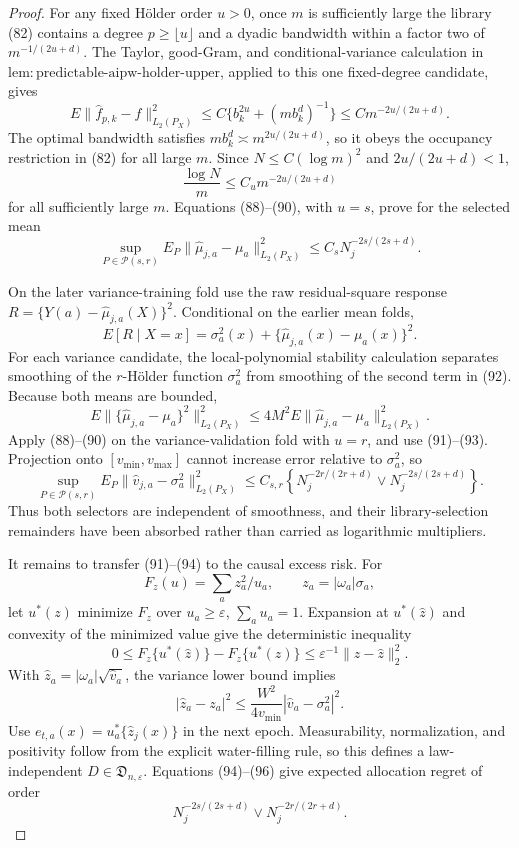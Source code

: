 \documentclass{article}
\begin{document}
\begin{proof}
For any fixed Hölder order \(u>0\), once \(m\) is sufficiently large the library (82) contains a degree \(p\geq\lfloor u\rfloor\) and a dyadic bandwidth within a factor two of \(m^{-1/(2u+d)}\). The Taylor, good-Gram, and conditional-variance calculation in \(\mathrm{lem{:}predictable\text{-}aipw\text{-}holder\text{-}upper}\), applied to this one fixed-degree candidate, gives
\[
E\|\widehat f_{p,k}-f\|_{L_2(P_X)}^2
\leq C\{b_k^{2u}+(mb_k^d)^{-1}\}
\leq C m^{-2u/(2u+d)}.
\tag{89}
\]
The optimal bandwidth satisfies \(mb_k^d\asymp m^{2u/(2u+d)}\), so it obeys the occupancy restriction in (82) for all large \(m\). Since \(N\leq C(\log m)^2\) and \(2u/(2u+d)<1\),
\[
\frac{\log N}{m}
\leq C_u m^{-2u/(2u+d)}
\tag{90}
\]
for all sufficiently large \(m\). Equations (88)--(90), with \(u=s\), prove for the selected mean
\[
\sup_{P\in\mathcal P(s,r)}
E_P\|\widehat\mu_{j,a}-\mu_a\|_{L_2(P_X)}^2
\leq C_sN_j^{-2s/(2s+d)}.
\tag{91}
\]

On the later variance-training fold use the raw residual-square response \(R=\{Y(a)-\widehat\mu_{j,a}(X)\}^2\). Conditional on the earlier mean folds,
\[
E[R\mid X=x]
=\sigma_a^2(x)+\{\widehat\mu_{j,a}(x)-\mu_a(x)\}^2.
\tag{92}
\]
For each variance candidate, the local-polynomial stability calculation separates smoothing of the \(r\)-Hölder function \(\sigma_a^2\) from smoothing of the second term in (92). Because both means are bounded,
\[
E\|\{\widehat\mu_{j,a}-\mu_a\}^2\|_{L_2(P_X)}^2
\leq4M^2E\|\widehat\mu_{j,a}-\mu_a\|_{L_2(P_X)}^2.
\tag{93}
\]
Apply (88)--(90) on the variance-validation fold with \(u=r\), and use (91)--(93). Projection onto \([v_{\min},v_{\max}]\) cannot increase error relative to \(\sigma_a^2\), so
\[
\sup_{P\in\mathcal P(s,r)}
E_P\|\widehat v_{j,a}-\sigma_a^2\|_{L_2(P_X)}^2
\leq C_{s,r}\left\{
N_j^{-2r/(2r+d)}\vee N_j^{-2s/(2s+d)}
\right\}.
\tag{94}
\]
Thus both selectors are independent of smoothness, and their library-selection remainders have been absorbed rather than carried as logarithmic multipliers.

It remains to transfer (91)--(94) to the causal excess risk. For
\[
F_z(u)=\sum_a z_a^2/u_a,
\qquad z_a=|\omega_a|\sigma_a,
\]
let \(u^*(z)\) minimize \(F_z\) over \(u_a\geq\varepsilon\), \(\sum_a u_a=1\). Expansion at \(u^*(\widehat z)\) and convexity of the minimized value give the deterministic inequality
\[
0\leq F_z\{u^*(\widehat z)\}-F_z\{u^*(z)\}
\leq\varepsilon^{-1}\|z-\widehat z\|_2^2.
\tag{95}
\]
With \(\widehat z_a=|\omega_a|\sqrt{\widehat v_a}\), the variance lower bound implies
\[
|\widehat z_a-z_a|^2
\leq\frac{W^2}{4v_{\min}}|\widehat v_a-\sigma_a^2|^2.
\tag{96}
\]
Use \(e_{t,a}(x)=u_a^*\{\widehat z_j(x)\}\) in the next epoch. Measurability, normalization, and positivity follow from the explicit water-filling rule, so this defines a law-independent \(D\in\mathfrak D_{n,\varepsilon}\). Equations (94)--(96) give expected allocation regret of order
\[
N_j^{-2s/(2s+d)}\vee N_j^{-2r/(2r+d)}.
\tag{97}
\]


\end{proof}
\end{document}
